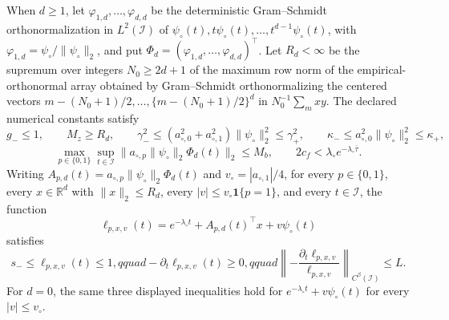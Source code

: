 When \(d\ge1\), let \(\varphi_{1,d},\ldots,\varphi_{d,d}\) be the deterministic Gram--Schmidt orthonormalization in \(L^2(\mathcal I)\) of \(\psi_\circ(t),t\psi_\circ(t),\ldots,t^{d-1}\psi_\circ(t)\), with \(\varphi_{1,d}=\psi_\circ/\|\psi_\circ\|_2\), and put \(\Phi_d=(\varphi_{1,d},\ldots,\varphi_{d,d})^\top\).  Let \(R_d<\infty\) be the supremum over integers \(N_0\ge2d+1\) of the maximum row norm of the empirical-orthonormal array obtained by Gram--Schmidt orthonormalizing the centered vectors \(m-(N_0+1)/2,\ldots,\{m-(N_0+1)/2\}^d\) in \(N_0^{-1}\sum_m xy\).  The declared numerical constants satisfy
\[
 g_-\le1,\qquad M_z\ge R_d,\qquad
 \gamma_-^2\le(a_{\circ,0}^2+a_{\circ,1}^2)\|\psi_\circ\|_2^2\le\gamma_+^2,
 \qquad
 \kappa_-\le a_{\circ,0}^2\|\psi_\circ\|_2^2\le\kappa_+,
\]
\[
 \max_{p\in\{0,1\}}\sup_{t\in\mathcal I}
 \bigl\|a_{\circ,p}\|\psi_\circ\|_2\Phi_d(t)\bigr\|_2\le M_b,
 \qquad
 2c_f<\lambda_\circ e^{-\lambda_\circ\bar\tau}.
\]
Writing \(A_{p,d}(t)=a_{\circ,p}\|\psi_\circ\|_2\Phi_d(t)\) and \(v_\circ=|a_{\circ,1}|/4\), for every \(p\in\{0,1\}\), every \(x\in\mathbb R^d\) with \(\|x\|_2\le R_d\), every \(|v|\le v_\circ\mathbf 1\{p=1\}\), and every \(t\in\mathcal I\), the function
\[
 \ell_{p,x,v}(t)=e^{-\lambda_\circ t}+A_{p,d}(t)^\top x+v\psi_\circ(t)
\]
satisfies
\[
 s_-\le\ell_{p,x,v}(t)\le1,qquad
 -\partial_t\ell_{p,x,v}(t)\ge0,qquad
 \left\|-\frac{\partial_t\ell_{p,x,v}}{\ell_{p,x,v}}\right\|_{C^\beta(\mathcal I)}\le L.
\]
For \(d=0\), the same three displayed inequalities hold for \(e^{-\lambda_\circ t}+v\psi_\circ(t)\) for every \(|v|\le v_\circ\).
